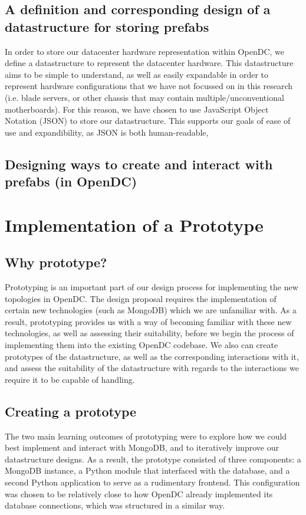 \documentclass[11pt]{article}
\begin{document}
	\subsection{A definition and corresponding design of a datastructure for storing prefabs}
		In order to store our datacenter hardware representation within OpenDC, we define a datastructure to represent the datacenter hardware. 
		This datastructure aims to be simple to understand, as well as easily expandable in order to represent hardware configurations that we have not focussed on in this research (i.e. blade servers, or other chassis that may contain multiple/unconventional motherboards). 
		For this reason, we have chosen to use JavaScript Object Notation (JSON) to store our datastructure. 
		This supports our goals of ease of use and expandibility, as JSON is both human-readable, 
	\subsection{Designing ways to create and interact with prefabs (in OpenDC)}

\section{Implementation of a Prototype}

	\subsection{Why prototype?}
		Prototyping is an important part of our design process for implementing the new topologies in OpenDC.
		The design proposal requires the implementation of certain new technologies (such as MongoDB) which we are unfamiliar with.
		As a result, prototyping provides us with a way of becoming familiar with these new technologies, as well as assessing their suitability, before we begin the process of implementing them into the existing OpenDC codebase.
		We also can create prototypes of the datastructure, as well as the corresponding interactions with it, and assess the suitability of the datastructure with regards to the interactions we require it to be capable of handling.
	\subsection{Creating a prototype}
		The two main learning outcomes of prototyping were to explore how we could best implement and interact with MongoDB, and to iteratively improve our datastructure designs.
		As a result, the prototype consisted of three components: a MongoDB instance, a Python module that interfaced with the database, and a second Python application to serve as a rudimentary frontend. 
		This configuration was chosen to be relatively close to how OpenDC already implemented its database connections, which was structured in a similar way. 
\end{document}
